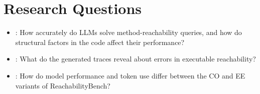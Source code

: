 \section{Research Questions}
\label{sec:research-questions}
\begin{itemize}[leftmargin=*]
    \item {}: How accurately do LLMs solve method-reachability queries, and how do structural factors in the code affect their performance?
    \item {}: What do the generated traces reveal about errors in executable reachability?
    \item {}: How do model performance and token use differ between the CO and EE variants of ReachabilityBench?
\end{itemize}



% 
